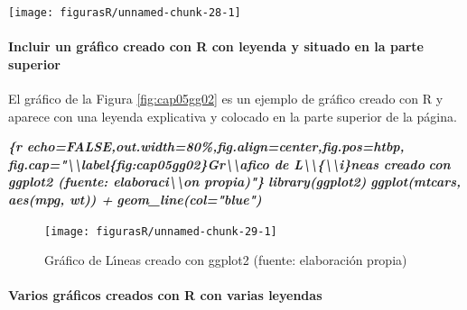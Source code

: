 \documentclass[12pt,a4paper,oneside,]{article}
\newenvironment{Shaded}{\begin{snugshade}}{\end{snugshade}}
\newcommand{\InformationTok}[1]{\textcolor[rgb]{0.56,0.35,0.01}{\textbf{\textit{#1}}}}
\let\oldparagraph\paragraph
\renewcommand{\paragraph}[1]{\oldparagraph{#1}\mbox{}}
\numberwithin{dummy}{section}
\theoremstyle{ocrenumbox}
\theoremstyle{blacknumex}
\theoremstyle{blacknumbox}
\theoremstyle{ocrenum}
\theoremstyle{ocrenum}
\begin{document}
\begin{center}\texttt{[image: figurasR/unnamed-chunk-28-1]} \end{center}

\hypertarget{incluir-un-gruxe1fico-creado-con-r-con-leyenda-y-situado-en-la-parte-superior}{%
\paragraph{Incluir un gráfico creado con R con leyenda y situado en la
parte
superior}\label{incluir-un-gruxe1fico-creado-con-r-con-leyenda-y-situado-en-la-parte-superior}}

El gráfico de la Figura \ref{fig:cap05gg02} es un ejemplo de gráfico
creado con R y aparece con una leyenda explicativa y colocado en la
parte superior de la página.

\begin{Shaded}
\begin{Highlighting}[]
\InformationTok{\textasciigrave{}\textasciigrave{}\textasciigrave{}\{r echo=FALSE,out.width=\textquotesingle{}80\%\textquotesingle{},fig.align=\textquotesingle{}center\textquotesingle{},fig.pos=\textquotesingle{}htbp\textquotesingle{},}
\InformationTok{fig.cap="\textbackslash{}\textbackslash{}label\{fig:cap05gg02\}Gr\textbackslash{}\textbackslash{}\textquotesingle{}afico de L\textbackslash{}\textbackslash{}\textquotesingle{}\{\textbackslash{}\textbackslash{}i\}neas creado }
\InformationTok{         con ggplot2 (fuente: elaboraci\textbackslash{}\textbackslash{}\textquotesingle{}on propia)"\}}
\InformationTok{library(ggplot2)}
\InformationTok{ggplot(mtcars, aes(mpg, wt)) + }
\InformationTok{  geom\_line(col="blue")}
\InformationTok{\textasciigrave{}\textasciigrave{}\textasciigrave{}}
\end{Highlighting}
\end{Shaded}

\begin{figure}[htbp]

{\centering \texttt{[image: figurasR/unnamed-chunk-29-1]} 

}

\caption{\label{fig:cap05gg02}Gr\'afico de L\'{\i}neas creado con ggplot2 (fuente: elaboraci\'on propia)}\label{fig:unnamed-chunk-29}
\end{figure}

\hypertarget{varios-gruxe1ficos-creados-con-r-con-varias-leyendas}{%
\paragraph{Varios gráficos creados con R con varias
leyendas}\label{varios-gruxe1ficos-creados-con-r-con-varias-leyendas}}
\end{document}
